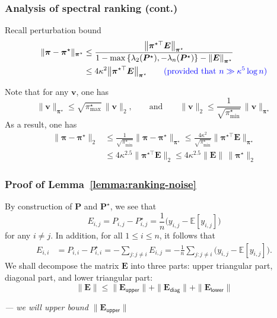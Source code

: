 \documentclass[compress,
mathserif,wide,%
]{beamer}
\begin{document}
\begin{frame}
	\frametitle{Analysis of spectral ranking (cont.)}
	Recall perturbation bound
	\begin{align}
	\|\bm{\pi}-\bm{\pi}^{\star}\|_{\bm{\pi}^{\star}}
	& \leq \frac{\big\Vert \bm{\pi}^{\star\top}\bm{E}\big\Vert _{\bm{\pi}^{\star}}}
	{1-\max\left\{ \lambda_{2}(\bm{P}^{\star}),-\lambda_{n}(\bm{P}^{\star})\right\} -\left\Vert \bm{E}\right\Vert _{\bm{\pi}^{\star}}} \nonumber \\
	& \leq 4 \kappa^2 \big\Vert \bm{\pi}^{\star\top}\bm{E}\big\Vert _{\bm{\pi}^{\star}} \qquad \textcolor{blue}{ (\text{provided that }n \gg \kappa^5 \log n)} \nonumber
\end{align}

Note that for any $\bm{v}$, one has 
\[
	\|\bm{v}\|_{\bm{\pi}^{\star}} \leq \sqrt{\pi^{\star}_{\max }} \, \|\bm{v}\|_2 , \qquad \text{and} \qquad
	\|\bm{v}\|_2  \leq  \frac{1}{\sqrt{  \pi^{\star}_{\min} } } \, \|\bm{v}\|_{\bm{\pi}^{\star}}
\]
As a result, one has
\begin{align*}
\|\bm{\pi}-\bm{\pi}^{\star}\|_{2} & \leq\frac{1}{\sqrt{\pi_{\min}^{\star}}}\|\bm{\pi}-\bm{\pi}^{\star}\|_{\bm{\pi}^{\star}}\leq\frac{4\kappa^{2}}{\sqrt{\pi_{\min}^{\star}}}\|\bm{\pi}^{\star\top}\bm{E}\|_{\bm{\pi}^{\star}}\\
 & \leq4\kappa^{2.5}\|\bm{\pi}^{\star\top}\bm{E}\|_{2} \leq4\kappa^{2.5}\|\bm{E}\|\,\|\bm{\pi}^{\star}\|_{2}
\end{align*}
\end{frame}

\begin{frame}
	\frametitle{Proof of Lemma~\ref{lemma:ranking-noise}}
	By construction of $\bm{P}$ and $\bm{P}^{\star}$, we see that
%
\begin{equation}
	E_{i,j}=P_{i,j}-P_{i,j}^{\star}=\frac{1}{n} \big( y_{i,j}- \mathbb{E} [ y_{i,j}] \big) \label{eq:ranking-noise-off-diag}
\end{equation}
%
for any $i\neq j$.
In addition, for all $1\leq i\leq n$, it follows that
%
\begin{align}
E_{i,i} & =P_{i,i}-P_{i,i}^{\star}
= -\sum_{j:j\neq i}E_{i,j}
  =-\frac{1}{n}\sum_{j:j\neq i}\big( y_{i,j}- \mathbb{E} [ y_{i,j}] \big) .\label{eq:ranking-noise-diag}
\end{align}
%
We shall decompose the matrix $\bm{E}$
into three parts: upper triangular part, diagonal part, and lower triangular
part:
%
\begin{equation}
\|\bm{E}\|\leq\|\bm{E}_{\mathsf{upper}}\|+\|\bm{E}_{\mathsf{diag}}\|+\|\bm{E}_{\mathsf{lower}}\|\label{eq:ranking-triangle}
\end{equation}
	
\vfill
{\hfill \em --- we will upper bound $\|\bm{E}_{\mathsf{upper}}\|$}
\end{frame}
\end{document}
